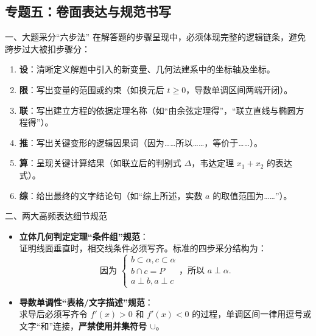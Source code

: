 \documentclass[11pt,a4paper]{ctexart}
\begin{document}
\newpage

\subsection{专题五：卷面表达与规范书写}

\begin{theorembox}{一、大题采分“六步法”}
在解答题的步骤呈现中，必须体现完整的逻辑链条，避免跨步过大被扣步骤分：
\begin{enumerate}
  \item \textbf{设}：清晰定义解题中引入的新变量、几何法建系中的坐标轴及坐标。
  \item \textbf{限}：写出变量的范围或约束（如换元后 $t \geqslant 0$，导数单调区间两端开闭）。
  \item \textbf{联}：写出建立方程的依据定理名称（如“由余弦定理得”，“联立直线与椭圆方程得”）。
  \item \textbf{推}：写出关键变形的逻辑因果词（因为……所以……，等价于……）。
  \item \textbf{算}：呈现关键计算结果（如联立后的判别式 $\Delta$，韦达定理 $x_1+x_2$ 的表达式）。
  \item \textbf{综}：给出最终的文字结论句（如“综上所述，实数 $a$ 的取值范围为……”）。
\end{enumerate}
\end{theorembox}

\begin{theorembox}{二、两大高频表达细节规范}
\begin{itemize}
  \item \textbf{立体几何判定定理“条件组”规范}：\\
  证明线面垂直时，相交线条件必须写齐。标准的四步采分结构为：
  \[
    \text{因为 } 
    \begin{cases}
      b \subset \alpha, c \subset \alpha \\
      b \cap c = P \\
      a \perp b, a \perp c
    \end{cases}
    \text{，所以 } a \perp \alpha.
  \]
  \item \textbf{导数单调性“表格/文字描述”规范}：\\
  求导后必须写齐令 $f'(x) > 0$ 和 $f'(x) < 0$ 的过程，单调区间一律用逗号或文字“和”连接，\textbf{严禁使用并集符号 $\cup$}。
\end{itemize}
\end{theorembox}

\newpage

\end{document}
